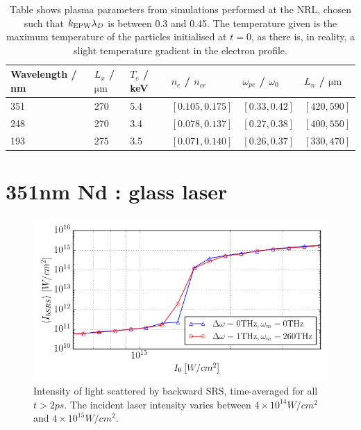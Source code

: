 \begin{table}[h]
\begin{center}

\begin{tabular}{|l|l|l|l|l|l|}
\hline
Wavelength / nm & $L_x$ /$\si{\micro\metre}$ & $T_e$ / keV & $n_e$ / $n_{cr}$ & $\omega_{pe}$ / $\omega_0$ & $L_n$ / $\si{\micro\metre}$
\\ \hline 
351 & 270 & 5.4 & $[0.105,0.175]$ & $[0.33,0.42]$ & $[420,590]$ \\ \hline
248 & 270 & 3.4 & $[0.078,0.137]$ & $[0.27,0.38]$ & $[400,550]$ \\ \hline
193 & 275 & 3.5 & $[0.071,0.140]$ & $[0.26,0.37]$ & $[330,470]$ \\ \hline

\end{tabular}

\end{center}
\caption{Table shows plasma parameters from simulations performed at the NRL, chosen such that $k_\mathrm{EPW}\lambda_D$ is between 0.3 and 0.45. The temperature given is the maximum temperature of the particles initialised at $t=0$, as there is, in reality, a slight temperature gradient in the electron profile.}
\label{tab:plasma}
\end{table}




\section{351nm Nd : glass laser}\label{sec:351}

\begin{figure}[ht]
   \centering
    \includegraphics[width=\columnwidth]{Chapters/C5_broadband/351nm_delw1_delw0.png}
    \caption{Intensity of light scattered by backward SRS, time-averaged for all $t>2\si{ps}$. The incident laser intensity varies between $4\times10^{14}\si{W/cm^2}$ and $4\times10^{15}\si{W/cm^2}$.}
    \label{fig:351nm_base_threshold}
\end{figure}{}


